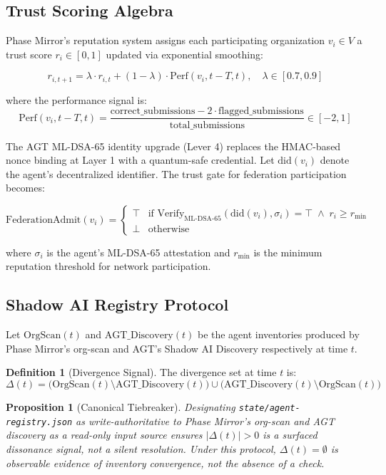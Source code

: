 \documentclass[12pt,a4paper]{article}
\newtheorem{proposition}[theorem]{Proposition}
\theoremstyle{definition}
\newtheorem{definition}[theorem]{Definition}
\theoremstyle{remark}
\begin{document}
\subsection{Trust Scoring Algebra}

Phase Mirror's reputation system assigns each participating organization
$v_i \in V$ a trust score $r_i \in [0, 1]$ updated via exponential smoothing:

\[
  r_{i,t+1} = \lambda \cdot r_{i,t} + (1-\lambda) \cdot \text{Perf}(v_i, t-T, t),
  \quad \lambda \in [0.7, 0.9]
\]

where the performance signal is:
\[
  \text{Perf}(v_i, t-T, t) =
  \frac{\text{correct\_submissions} - 2 \cdot \text{flagged\_submissions}}
       {\text{total\_submissions}}
  \in [-2, 1]
\]

The AGT ML-DSA-65 identity upgrade (Lever 4) replaces the HMAC-based nonce
binding at Layer 1 with a quantum-safe credential. Let $\text{did}(v_i)$
denote the agent's decentralized identifier. The trust gate for federation
participation becomes:

\[
  \text{FederationAdmit}(v_i) = \begin{cases}
    \top & \text{if } \text{Verify}_{\text{ML-DSA-65}}(\text{did}(v_i),
            \sigma_i) = \top \;\wedge\; r_i \geq r_{\min} \\
    \bot & \text{otherwise}
  \end{cases}
\]

where $\sigma_i$ is the agent's ML-DSA-65 attestation and $r_{\min}$ is the
minimum reputation threshold for network participation.

\subsection{Shadow AI Registry Protocol}

Let $\text{OrgScan}(t)$ and $\text{AGT\_Discovery}(t)$ be the agent inventories
produced by Phase Mirror's org-scan and AGT's Shadow AI Discovery respectively
at time $t$.

\begin{definition}[Divergence Signal]
The divergence set at time $t$ is:
\[
  \Delta(t) = \bigl(\text{OrgScan}(t) \setminus \text{AGT\_Discovery}(t)\bigr)
  \cup \bigl(\text{AGT\_Discovery}(t) \setminus \text{OrgScan}(t)\bigr)
\]
\end{definition}

\begin{proposition}[Canonical Tiebreaker]
Designating \texttt{state/agent-registry.json} as write-authoritative to
Phase Mirror's org-scan and AGT discovery as a read-only input source
ensures $|\Delta(t)| > 0$ is a surfaced dissonance signal, not a silent
resolution.  Under this protocol, $\Delta(t) = \emptyset$ is observable
evidence of inventory convergence, not the absence of a check.
\end{proposition}
\end{document}
